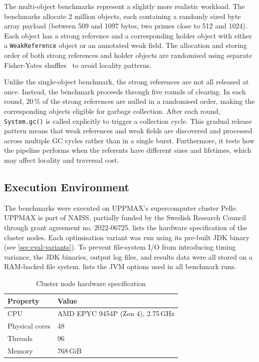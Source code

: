 The multi-object benchmarks represent a slightly more realistic workload. The benchmarks allocate 2 million objects, each containing a randomly sized byte array payload (between 509 and 1097 bytes, two primes close to 512 and 1024). Each object has a strong reference and a corresponding holder object with either a \texttt{WeakReference} object or an annotated weak field. The allocation and storing order of both strong references and holder objects are randomised using separate Fisher-Yates shuffles~\cite{knuth97-taocp2} to avoid locality patterns.

Unlike the single-object benchmark, the strong references are not all released at once. Instead, the benchmark proceeds through five rounds of clearing. In each round, 20\,\% of the strong references are nulled in a randomised order, making the corresponding objects eligible for garbage collection. After each round, \texttt{System.gc()} is called explicitly to trigger a collection cycle. This gradual release pattern means that weak references and weak fields are discovered and processed across multiple \ac{GC} cycles rather than in a single burst. Furthermore, it tests how the pipeline performs when the referents have different sizes and lifetimes, which may affect locality and traversal cost.

\subsection{Execution Environment}
\label{subsec:eval-env}

The benchmarks were executed on \ac{UPPMAX}'s supercomputer cluster Pelle. \ac{UPPMAX} is part of \ac{NAISS}, partially funded by the Swedish Research Council through grant agreement no. 2022-06725.  lists the hardware specification of the cluster nodes. Each optimisation variant was run using its pre-built \ac{JDK} binary (see \cref{sec:eval-variants}). To prevent file-system I/O from introducing timing variance, the \ac{JDK} binaries, output log files, and results data were all stored on a RAM-backed file system.  lists the \ac{JVM} options used in all benchmark runs.

\begin{table}[t]
\centering
\caption{Cluster node hardware specification}
\label{tab:cluster-specs}
\begin{tabular}{@{}ll@{}}
\toprule
\textbf{Property} & \textbf{Value} \\
\midrule
\ac{CPU} & AMD EPYC 9454P (Zen 4), 2.75\,GHz \\
Physical cores & 48 \\
Threads & 96 \\
Memory & 768\,GiB \\
\bottomrule
\end{tabular}
\end{table}

